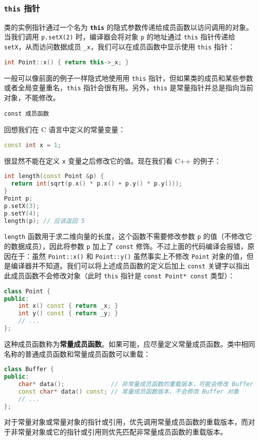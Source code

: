 \documentclass[hyperref,UTF8]{article}
\begin{document}
\subsubsection{\texttt{this} 指针}

类的实例指针通过一个名为 \textbf{\texttt{this}} 的隐式参数传递给成员函数以访问调用的对象。当我们调用 \texttt{p.setX(2)} 时，编译器会将对象 \texttt{p} 的地址通过 \texttt{this} 指针传递给 \texttt{setX}，从而访问数据成员 \texttt{\_x}，我们可以在成员函数中显示使用 \texttt{this} 指针：
\begin{lstlisting}[language=c++]
int Point::x() { return this->_x; }
\end{lstlisting}
一般可以像前面的例子一样隐式地使用用 \texttt{this} 指针，但如果类的成员和某些参数或者全局变量重名，\texttt{this} 指针会很有用。另外，\texttt{this} 是常量指针并总是指向当前对象，不能修改。

\texttt{const 成员函数}

回想我们在 C 语言中定义的常量变量：
\begin{lstlisting}[language=c++]
const int x = 1;
\end{lstlisting}
很显然不能在定义 \texttt{x} 变量之后修改它的值。现在我们看 C++ 的例子：
\begin{lstlisting}[language=c++]
int length(const Point &p) {
  return int(sqrt(p.x() * p.x() + p.y() * p.y()));
}
Point p;
p.setX(3);
p.setY(4);
length(p); // 应该返回 5
\end{lstlisting}
\texttt{length} 函数用于求二维向量的长度，这个函数不需要修改参数 \texttt{p} 的值（不修改它的数据成员），因此将参数 \texttt{p} 加上了 \texttt{const} 修饰。不过上面的代码编译会报错，原因在于：虽然 \texttt{Point::x()} 和 \texttt{Point::y()} 虽然事实上不修改 \texttt{Point} 对象的值，但是编译器并不知道。我们可以将上述成员函数的定义后加上 \texttt{const} 关键字以指出此成员函数不会修改对象（此时 \texttt{this} 指针是 \texttt{const Point* const} 类型）：
\begin{lstlisting}[language=c++]
class Point {
public:
    int x() const { return _x; }
    int y() const { return _y; }
    // ...
};
\end{lstlisting}
这种成员函数称为\textbf{常量成员函数}。如果可能，应尽量定义常量成员函数。类中相同名称的普通成员函数和常量成员函数可以重载：
\begin{lstlisting}[language=c++]
class Buffer {
public:
    char* data();             // 非常量成员函数的重载版本，可能会修改 Buffer 对象
    const char* data() const; // 常量成员函数版本，不会修改 Buffer 对象
    // ...
};
\end{lstlisting}
对于常量对象或常量对象的指针或引用，优先调用常量成员函数的重载版本，而对于非常量对象或它的指针或引用则优先匹配非常量成员函数的重载版本。
\end{document}

